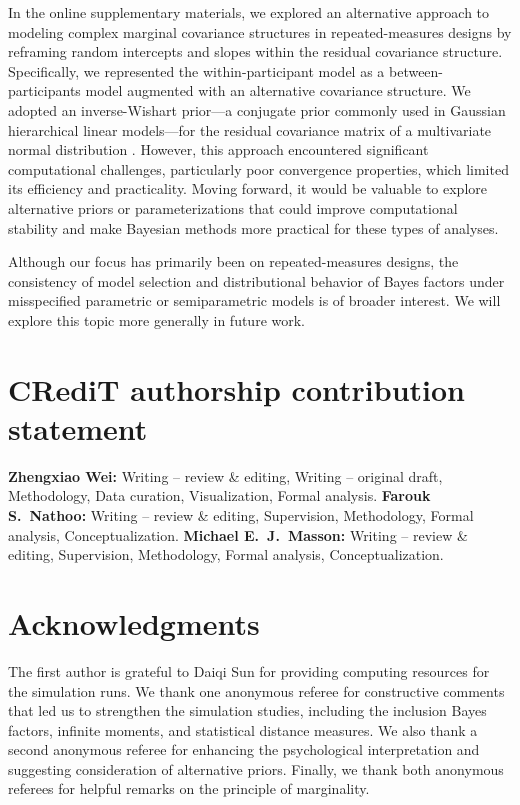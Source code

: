 \documentclass[preprint,12pt,authoryear]{elsarticle}
\begin{document}
In the online supplementary materials, we explored an alternative approach to modeling complex marginal covariance structures in repeated-measures designs by reframing random intercepts and slopes within the residual covariance structure. Specifically, we represented the within-participant model as a between-participants model augmented with an alternative covariance structure. We adopted an inverse-Wishart prior—a conjugate prior commonly used in Gaussian hierarchical linear models—for the residual covariance matrix of a multivariate normal distribution \citep{chung_weakly_2015,liu_comparison_2016,zhang_note_2021}. However, this approach encountered significant computational challenges, particularly poor convergence properties, which limited its efficiency and practicality. Moving forward, it would be valuable to explore alternative priors or parameterizations that could improve computational stability and make Bayesian methods more practical for these types of analyses.

Although our focus has primarily been on repeated-measures designs, the consistency of model selection and distributional behavior of Bayes factors under misspecified parametric or semiparametric models is of broader interest. We will explore this topic more generally in future work. 


\clearpage

\section*{CRediT authorship contribution statement}

\textbf{Zhengxiao Wei:} Writing – review \& editing, Writing – original draft, Methodology, Data curation, Visualization, Formal analysis. \textbf{Farouk S.~Nathoo:} Writing – review \& editing, Supervision, Methodology, Formal analysis, Conceptualization. \textbf{Michael E.~J.~Masson:} Writing – review \& editing, Supervision, Methodology, Formal analysis, Conceptualization.

\section*{Acknowledgments}

The first author is grateful to Daiqi Sun for providing computing resources for the simulation runs. We thank one anonymous referee for constructive comments that led us to strengthen the simulation studies, including the inclusion Bayes factors, infinite moments, and statistical distance measures. We also thank a second anonymous referee for enhancing the psychological interpretation and suggesting consideration of alternative priors. Finally, we thank both anonymous referees for helpful remarks on the principle of marginality.
\end{document}
